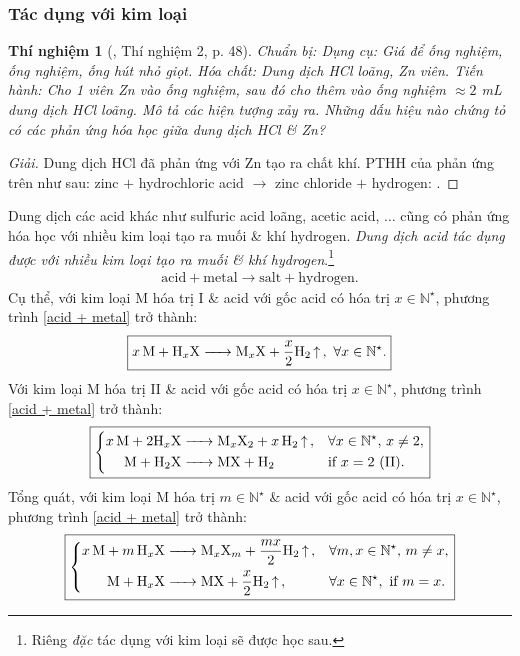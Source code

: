 \documentclass{article}
\newtheorem{thinghiem}{Thí nghiệm}
\begin{document}
\subsubsection{Tác dụng với kim loại}

\begin{thinghiem}[\cite{SGK_KHTN_8_Canh_Dieu}, Thí nghiệm 2, p. 48]
	\emph{Chuẩn bị:} Dụng cụ: Giá để ống nghiệm, ống nghiệm, ống hút nhỏ giọt. Hóa chất: Dung dịch \emph{HCl} loãng, \emph{Zn} viên. \emph{Tiến hành:} Cho 1 viên \emph{Zn} vào ống nghiệm, sau đó cho thêm vào ống nghiệm $\approx 2$ \emph{mL} dung dịch \emph{HCl} loãng. Mô tả các hiện tượng xảy ra. Những dấu hiệu nào chứng tỏ có các phản ứng hóa học giữa dung dịch \emph{HCl} \& \emph{Zn}?
\end{thinghiem}

\begin{proof}[Giải]
	Dung dịch HCl đã phản ứng với Zn tạo ra chất khí. PTHH của phản ứng trên như sau: zinc $+$ hydrochloric acid $\to$ zinc chloride $+$ hydrogen: .
\end{proof}
Dung dịch các acid khác như sulfuric acid loãng, acetic acid, $\ldots$ cũng có phản ứng hóa học với nhiều kim loại tạo ra muối \& khí hydrogen. \textit{Dung dịch acid tác dụng được với nhiều kim loại tạo ra muối \& khí hydrogen}.\footnote{Riêng  \textit{đặc} tác dụng với kim loại sẽ được học sau.}
\begin{align}
	\label{acid + metal}
	\boxed{\mbox{acid} + \mbox{metal}\to\mbox{salt} + \mbox{hydrogen}.}
\end{align}
Cụ thể, với kim loại M hóa trị I \& acid  với gốc acid  có hóa trị $x\in\mathbb{N}^\star$, phương trình \eqref{acid + metal} trở thành:
\begin{align}
	\boxed{\ce{$x$M + H_xX -> M_xX + $\frac{x}{2}$H2 ^},\ \forall x\in\mathbb{N}^\star.}
\end{align}
Với kim loại M hóa trị II \& acid  với gốc acid  có hóa trị $x\in\mathbb{N}^\star$, phương trình \eqref{acid + metal} trở thành:
\begin{equation}
	\boxed{\left\{\begin{split}
			\ce{$x$M + $2$H_xX &-> M_xX2 + $x$H2 ^},&&\forall x\in\mathbb{N}^\star,\,x\ne2,\\
			\ce{M + H2X &-> MX + H2}&&\mbox{if } x = 2\ (\mbox{II}).
		\end{split}\right.}
\end{equation}
Tổng quát, với kim loại M hóa trị $m\in\mathbb{N}^\star$ \& acid  với gốc acid  có hóa trị $x\in\mathbb{N}^\star$, phương trình \eqref{acid + metal} trở thành:
\begin{equation}
	\boxed{\left\{\begin{split}
			\ce{$x$M + $m$H_xX &-> M_xX_m + $\frac{mx}{2}$H2 ^},&&\forall m,x\in\mathbb{N}^\star,\,m\ne x,\\
			\ce{M + H_xX &-> MX + $\frac{x}{2}$H2 ^},&&\forall x\in\mathbb{N}^\star,\mbox{ if } m = x.
		\end{split}\right.}
\end{equation}
\end{document}
